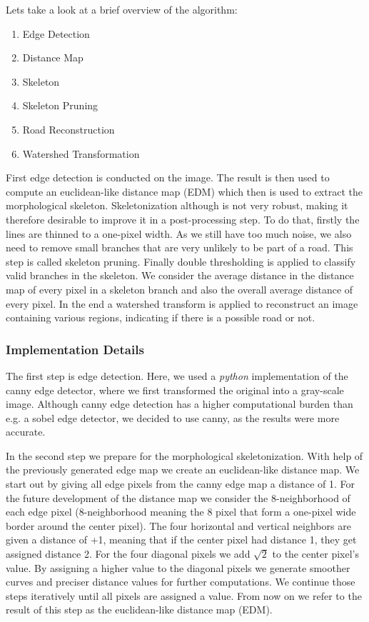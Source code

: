 \documentclass[10pt,conference,compsocconf]{IEEEtran}
\begin{document}
Lets take a look at a brief overview of the algorithm:
\begin{enumerate}
	\item Edge Detection
	\item Distance Map
	\item Skeleton
	\item Skeleton Pruning
	\item Road Reconstruction
	\item Watershed Transformation
\end{enumerate}
First edge detection is conducted on the image. The result is then used to compute an euclidean-like distance map (EDM) which then is used to extract the morphological skeleton. Skeletonization although is not very robust, making it therefore desirable to improve it in a post-processing step. To do that, firstly the lines are thinned to a one-pixel width. As we still have too much noise, we also need to remove small branches that are very unlikely to be part of a road. This step is called skeleton pruning. Finally double thresholding is applied to classify valid branches in the skeleton. We consider the average distance in the distance map of every pixel in a skeleton branch and also the overall average distance of every pixel. In the end a watershed transform is applied to reconstruct an image containing various regions, indicating if there is a possible road or not.

\subsubsection{Implementation Details} \hspace*{\fill}

The first step is edge detection. Here, we used a \emph{python} implementation of the canny edge detector, where we first transformed the original into a gray-scale image. Although canny edge detection has a higher computational burden than e.g. a sobel edge detector, we decided to use canny, as the results were more accurate.

In the second step we prepare for the morphological skeletonization. With help of the previously generated edge map we create an euclidean-like distance map. We start out by giving all edge pixels from the canny edge map a distance of 1. For the future development of the distance map we consider the 8-neighborhood of each edge pixel (8-neighborhood meaning the 8 pixel that form a one-pixel wide border around the center pixel). The four horizontal and vertical neighbors are given a distance of +1, meaning that if the center pixel had distance 1, they get assigned distance 2. For the four diagonal pixels we add $\sqrt{2}$ to the center pixel's value. By assigning a higher value to the diagonal pixels we generate smoother curves and preciser distance values for further computations. We continue those steps iteratively until all pixels are assigned a value. From now on we refer to the result of this step as the euclidean-like distance map (EDM).
\end{document}
